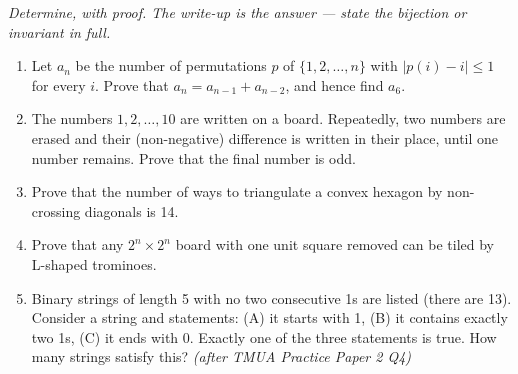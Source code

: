 \documentclass[11pt,a4paper]{article}
\begin{document}
\noindent\textit{Determine, with proof. The write-up is the answer --- state the bijection or invariant in full.}

\begin{enumerate}

\item Let $a_n$ be the number of permutations $p$ of $\{1,2,\ldots,n\}$ with $|p(i)-i|\leq1$ for every $i$. Prove that $a_n=a_{n-1}+a_{n-2}$, and hence find $a_6$.

\item The numbers $1,2,\ldots,10$ are written on a board. Repeatedly, two numbers are erased and their (non-negative) difference is written in their place, until one number remains. Prove that the final number is odd.

\item Prove that the number of ways to triangulate a convex hexagon by non-crossing diagonals is 14.

\item Prove that any $2^n\times2^n$ board with one unit square removed can be tiled by L-shaped trominoes.

\item Binary strings of length 5 with no two consecutive 1s are listed (there are 13). Consider a string and statements: (A) it starts with 1, (B) it contains exactly two 1s, (C) it ends with 0. Exactly one of the three statements is true. How many strings satisfy this? \textit{\small(after TMUA Practice Paper 2 Q4)}

\end{enumerate}

\end{document}
